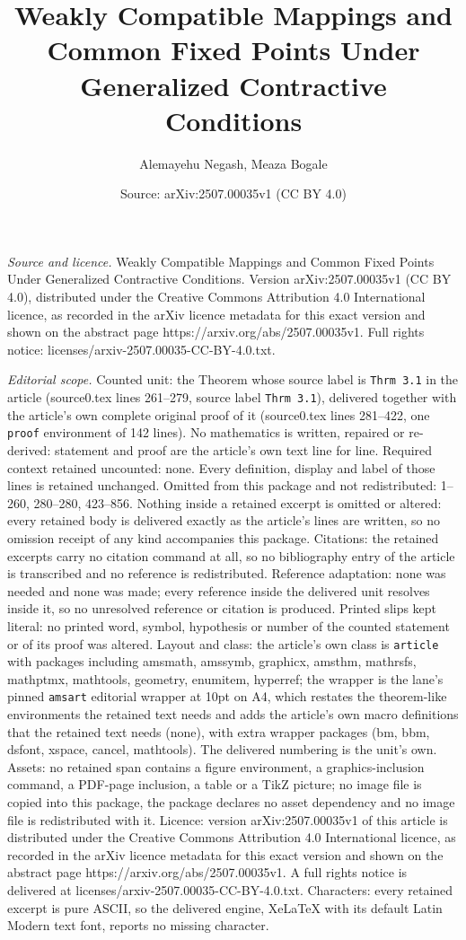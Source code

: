 \documentclass[10pt,a4paper]{amsart}
\title[Weakly Compatible Mappings and Common Fixed Points Under Gen]{Weakly Compatible Mappings and Common Fixed Points Under Generalized Contractive Conditions}
\author{Alemayehu Negash, Meaza Bogale}
\date{Source: arXiv:2507.00035v1 (CC BY 4.0)}
\begin{document}
\maketitle

\noindent\emph{Source and licence.} Weakly Compatible Mappings and Common Fixed Points Under Generalized Contractive Conditions. Version arXiv:2507.00035v1 (CC BY 4.0), distributed under the Creative Commons Attribution 4.0 International licence, as recorded in the arXiv licence metadata for this exact version and shown on the abstract page https://arxiv.org/abs/2507.00035v1. Full rights notice: licenses/arxiv-2507.00035-CC-BY-4.0.txt.\par\smallskip

\noindent\textit{Editorial scope.} Counted unit: the Theorem whose source label is \texttt{Thrm 3.1} in the article (source0.tex lines 261--279, source label \texttt{Thrm 3.1}), delivered together with the article's own complete original proof of it (source0.tex lines 281--422, one \texttt{proof} environment of 142 lines). No mathematics is written, repaired or re-derived: statement and proof are the article's own text line for line. Required context retained uncounted: none. Every definition, display and label of those lines is retained unchanged. Omitted from this package and not redistributed: 1--260, 280--280, 423--856. Nothing inside a retained excerpt is omitted or altered: every retained body is delivered exactly as the article's lines are written, so no omission receipt of any kind accompanies this package. Citations: the retained excerpts carry no citation command at all, so no bibliography entry of the article is transcribed and no reference is redistributed. Reference adaptation: none was needed and none was made; every reference inside the delivered unit resolves inside it, so no unresolved reference or citation is produced. Printed slips kept literal: no printed word, symbol, hypothesis or number of the counted statement or of its proof was altered. Layout and class: the article's own class is \texttt{article} with packages including amsmath, amssymb, graphicx, amsthm, mathrsfs, mathptmx, mathtools, geometry, enumitem, hyperref; the wrapper is the lane's pinned \texttt{amsart} editorial wrapper at 10pt on A4, which restates the theorem-like environments the retained text needs and adds the article's own macro definitions that the retained text needs (none), with extra wrapper packages (bm, bbm, dsfont, xspace, cancel, mathtools). The delivered numbering is the unit's own. Assets: no retained span contains a figure environment, a graphics-inclusion command, a PDF-page inclusion, a table or a TikZ picture; no image file is copied into this package, the package declares no asset dependency and no image file is redistributed with it. Licence: version arXiv:2507.00035v1 of this article is distributed under the Creative Commons Attribution 4.0 International licence, as recorded in the arXiv licence metadata for this exact version and shown on the abstract page https://arxiv.org/abs/2507.00035v1. A full rights notice is delivered at licenses/arxiv-2507.00035-CC-BY-4.0.txt. Characters: every retained excerpt is pure ASCII, so the delivered engine, XeLaTeX with its default Latin Modern text font, reports no missing character.
\end{document}
